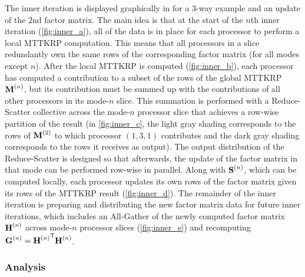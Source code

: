 The inner iteration is displayed graphically in  for a 3-way example and an update of the $2$nd factor matrix.
The main idea is that at the start of the $n$th inner iteration (\cref{fig:inner_a}), all of the data is in place for each processor to perform a local MTTKRP computation.
This means that all processors in a slice redundantly own the same rows of the corresponding factor matrix (for all modes except $n$).
After the local MTTKRP is computed (\cref{fig:inner_b}), each processor has computed a contribution to a subset of the rows of the global MTTKRP $\Mn{M}{n}$, but its contribution must be summed up with the contributions of all other processors in its mode-$n$ slice.
This summation is performed with a Reduce-Scatter collective across the mode-$n$ processor slice that achieves a row-wise partition of the result (in \cref{fig:inner_c}, the light gray shading corresponds to the rows of $\Mn{M}{2}$ to which processor $(1,3,1)$ contributes and the dark gray shading corresponds to the rows it receives as output).
The output distribution of the Reduce-Scatter is designed so that afterwards, the update of the factor matrix in that mode can be performed row-wise in parallel.
Along with $\Mn{S}{n}$, which can be computed locally, each processor updates its own rows of the factor matrix given its rows of the MTTKRP result (\cref{fig:inner_d}).
The remainder of the inner iteration is preparing and distributing the new factor matrix data for future inner iterations, which includes an All-Gather of the newly computed factor matrix $\Mn{H}{n}$ across mode-$n$ processor slices (\cref{fig:inner_e}) and recomputing $\Mn{G}{n}={\Mn{H}{n}}^\Tra\Mn{H}{n}$.

\subsubsection{Analysis}

